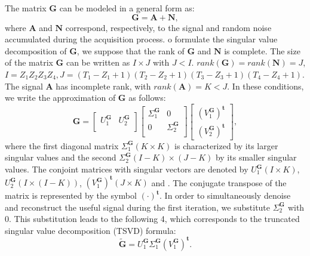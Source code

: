 The matrix {$\mathbf{G}$} can be modeled in a general form as:
\begin{equation}
\mathbf{G} = \mathbf{A}+\mathbf{N},                       
\end{equation}
where $\mathbf{A}$ and $\mathbf{N}$ correspond, respectively, to the signal and random noise accumulated during the acquisition process. o formulate the singular value decomposition of $ \mathbf{G} $, we suppose that the rank of {$ \mathbf{G} $} and $\mathbf{N}$ is complete. The size of the matrix {$\mathbf{G}$} can be written as {$I \times J$} with {$J < I$}. {$rank(\mathbf{G})=rank(\mathbf{N}) = J$, $I= Z_1Z_2Z_3Z_4, J= (T_1 -  Z_1 + 1)(T_2 - Z_2 + 1)(T_3 -  Z_3 + 1)(T_4 - Z_4 + 1)$}. The signal {$\mathbf{A}$} has incomplete rank, with {$rank(\mathbf{A})= K < J$}. In these conditions, we write the approximation of {$\mathbf{G}$} as follows:
\begin{equation}
\mathbf{G}=\begin{bmatrix}
U^{\mathbf{G}}_1 & U^{\mathbf{G}}_2\\
\end{bmatrix}
\begin{bmatrix}
\Sigma^{\mathbf{G}}_1 & 0\\
0 & \Sigma^{\mathbf{G}}_2\\
\end{bmatrix}
\begin{bmatrix}
(V^{\mathbf{G}}_1)^{\mathbf{t}}\\
(V^{\mathbf{G}}_2)^{\mathbf{t}}
\end{bmatrix},
\end{equation}
where the first diagonal matrix {$\Sigma^{\mathbf{G}}_1(K\times K)$} is characterized by its larger singular values and the second {$\Sigma^{\mathbf{G}}_2(I -  K) \times(J -  K)$} by its smaller singular values. The conjoint matrices with singular vectors are denoted by {$U^{\mathbf{G}}_1(I \times K)$}, {$U^{\mathbf{G}}_2(I\times(I -  K))$}, {$(V^{\mathbf{G}}_1)^{\mathbf{t}}(J \times K)$} and  . The conjugate transpose of the matrix is represented by the symbol {$\left(\cdot\right)^{\mathbf{t}}$}. In order to simultaneously denoise and reconstruct the useful signal during the first iteration, we substitute {$\Sigma^{\mathbf{G}}_2$} with {$0$}. This substitution leads to the following  4, which corresponds to the truncated singular value decomposition (TSVD) formula:
\begin{equation}
\mathbf{\tilde{G}}=U^{\mathbf{G}}_1{\Sigma^{\mathbf{G}}_1}{(V^{\mathbf{G}}_1)^{\mathbf{t}}}.
\end{equation}
